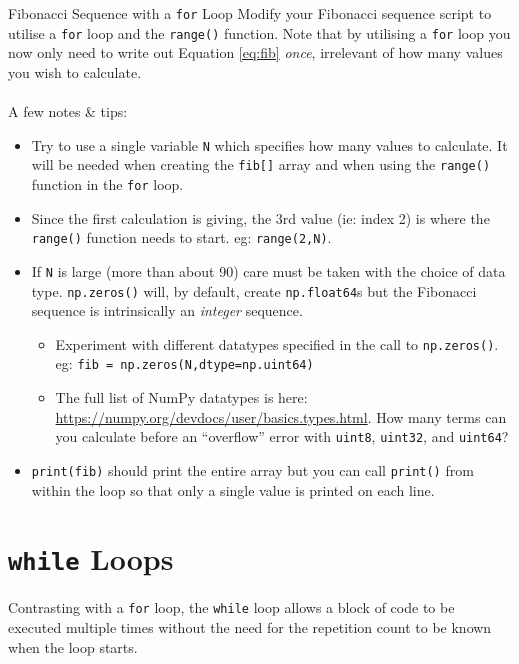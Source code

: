 \documentclass{lab}
\begin{document}
\begin{task}{Fibonacci Sequence with a \texttt{for} Loop}{}
Modify your Fibonacci sequence script to utilise a \texttt{for} loop and the \texttt{range()} function. Note that by utilising a \texttt{for} loop you now only need to write out Equation \ref{eq:fib} \textit{once}, irrelevant of how many values you wish to calculate.
\\~\\
A few notes \& tips:
\\
\begin{itemize}
\item Try to use a single variable \texttt{N} which specifies how many values to calculate. It will be needed when creating the \texttt{fib[]} array and when using the \texttt{range()} function in the \texttt{for} loop.
\item Since the first calculation is giving, the 3rd value (ie: index 2) is where the \texttt{range()} function needs to start. eg: \texttt{range(2,N)}.
\item If \texttt{N} is large (more than about 90) care must be taken with the choice of data type. \texttt{np.zeros()} will, by default, create \texttt{np.float64}s but the Fibonacci sequence is intrinsically an \textit{integer} sequence.

\begin{itemize}
\item Experiment with different datatypes specified in the call to \texttt{np.zeros()}. eg: \texttt{fib = np.zeros(N,dtype=np.uint64)}
\item The full list of NumPy datatypes is here: \url{https://numpy.org/devdocs/user/basics.types.html}. How many terms can you calculate before an ``overflow'' error with \texttt{uint8}, \texttt{uint32}, and \texttt{uint64}?
\end{itemize}
\item \texttt{print(fib)} should print the entire array but you can call \texttt{print()} from within the loop so that only a single value is printed on each line.
\end{itemize}
\end{task}

\pagebreak

\section{\texttt{while} Loops}
Contrasting with a \texttt{for} loop, the \texttt{while} loop allows a block of code to be executed multiple times without the need for the repetition count to be known when the loop starts.
\end{document}
